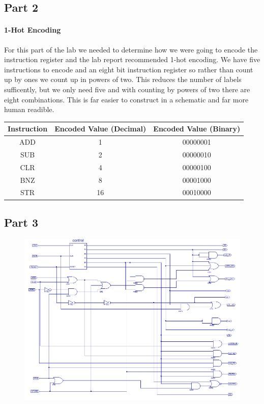 \documentclass[12pt]{article}
\begin{document}
	\subsection{Part 2}
		\paragraph*{1-Hot Encoding}
			For this part of the lab we needed to determine how we were going to encode the instruction register and the lab report recommended 1-hot encoding. We have five instructions to encode and an eight bit instruction register so rather than count up by ones we count up in powers of two. This reduces the number of labels sufficently, but we only need five and with counting by powers of two there are eight combinations. This is far easier to construct in a schematic and far more human readible.\\

			\begin{tabular}{c c c}
			\textbf{Instruction} & \textbf{Encoded Value (Decimal)} & \textbf{Encoded Value (Binary)}\\
			\hline
			ADD & 1  & 00000001\\
			SUB & 2  & 00000010\\
			CLR & 4  & 00000100\\
			BNZ & 8  & 00001000\\
			STR & 16 & 00010000\\
			\end{tabular}
		
	\subsection{Part 3}
		
		\begin{figure}[h]
			\includegraphics[scale=.6]{controller_sch.png}
		\end{figure}
		
\end{document}
